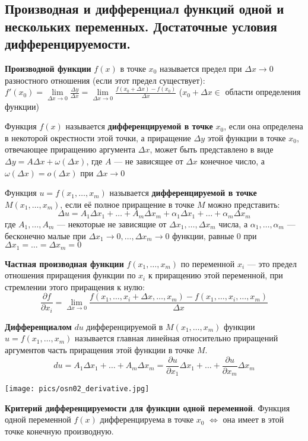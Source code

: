 \subsection{Производная и дифференциал функций одной и нескольких переменных. Достаточные условия дифференцируемости.}

\textbf{Производной функции} $f(x)$ в точке $x_0$ называется предел при $\Delta x \to 0$ разностного отношения (если этот предел существует): $f'(x_0) = \lim \limits_{\Delta x \to 0}\frac{\Delta y}{\Delta x} = \lim \limits_{\Delta x \to 0} \frac{f(x_0+\Delta x)-f(x_0)}{\Delta x}$ ($x_0 + \Delta x \in$ области определения функции)

\bigbreak
Функция $f(x)$ называется \textbf{дифференцируемой в точке} $x_0$, если она определена в некоторой окрестности этой точки, а приращение $\Delta y$ этой функции в точке $x_0$, отвечающее приращению аргумента $\Delta x$, может быть представлено в виде $\Delta y = A \Delta x+ \omega(\Delta x)$, где $A$ --- не зависящее от $\Delta x$ конечное число, а $\omega(\Delta x) = o(\Delta x)$ при $\Delta x \to 0$

\bigbreak
Функция $u = f(x_1,\dots,x_m)$ называется \textbf{дифференцируемой в точке $M(x_1,\dots,x_m)$}, если её полное приращение в точке $M$ можно представить: 
$$ \Delta u= A_1 \Delta x_1 +\dots+A_m \Delta x_m + \alpha_1 \Delta x_1 +\dots+ \alpha_m \Delta x_m $$
где $A_1, \dots, A_m$ --- некоторые не зависящие от $\Delta x_1, \dots, \Delta x_m$ числа, а $ \alpha_1, \dots, \alpha_m$ --- бесконечно малые при $\Delta x_1 \to 0, \dots, \Delta x_m \to 0$ функции, равные 0 при $\Delta x_1 = \dots = \Delta x_m = 0$

\bigbreak
\textbf{Частная производная функции} $f(x_1,\dots,x_m)$ по переменной $x_i$ --- это предел отношения приращения функции по $x_i$ к приращению этой переменной, при стремлении этого приращения к нулю: $$ \frac{\partial f}{\partial x_i} = \lim\limits_{\Delta x \to 0}\frac{ f(x_1,\dots,x_i +\Delta x,\dots,x_m)-f(x_1,\dots,x_i,\dots,x_m)}{\Delta x}$$

\bigbreak
\textbf{Дифференциалом} $du$ дифференцируемой в $M(x_1,\dots,x_m)$ функции $u = f(x_1,\dots,x_m)$ называется главная линейная относительно приращений аргументов часть приращения этой функции в точке $M.$
$$du=A_1\Delta x_1 +\dots+A_m \Delta x_m = \frac{\partial u}{\partial x_1}\Delta x_1 +\dots+ \frac{\partial u}{\partial x_m}\Delta x_m$$

\texttt{[image: pics/osn02\_derivative.jpg]}

\textbf{Критерий дифференцируемости для функции одной переменной}. Функция одной переменной $f(x)$ дифференцируема в точке $x_0$ $\iff$ она имеет в этой точке конечную производную.

